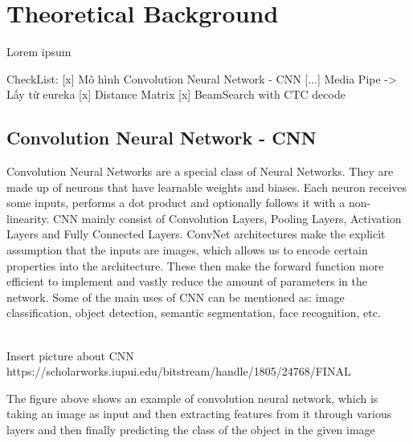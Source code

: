 \chapter{Theoretical Background}

Lorem ipsum

CheckList:
    [x] Mô hình Convolution Neural Network - CNN
    [...] Media Pipe -> Lấy từ eureka
    [x] Distance Matrix
    [x] BeamSearch with CTC decode

  \section{ Convolution Neural Network - CNN }
    Convolution Neural Networks are a special class of Neural Networks. They are made up 
    of neurons that have learnable weights and biases. Each neuron receives some inputs, 
    performs a dot product and optionally follows it with a non-linearity. CNN mainly consist
    of Convolution Layers, Pooling Layers, Activation Layers and Fully Connected Layers.
    ConvNet architectures make the explicit assumption that the inputs are images, 
    which allows us to encode certain properties into the architecture. These then 
    make the forward function more efficient to implement and vastly reduce the amount 
    of parameters in the network. Some of the main uses of CNN can be mentioned as: image
    classification, object detection, semantic segmentation, face recognition, etc.
    
    \\Insert picture about CNN https://scholarworks.iupui.edu/bitstream/handle/1805/24768/FINAL%
    
      The figure above shows an example of convolution neural network, which is taking an image 
    as input and then extracting features from it through various layers and then finally predicting the
    class of the object in the given image

